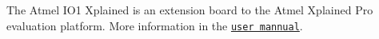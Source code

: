 The Atmel I\+O1 Xplained is an extension board to the Atmel Xplained Pro evaluation platform. More information in the \href{http://www.atmel.com/images/atmel-42078-io1-xplained-pro_user-guide.pdf}{\tt user mannual}. 